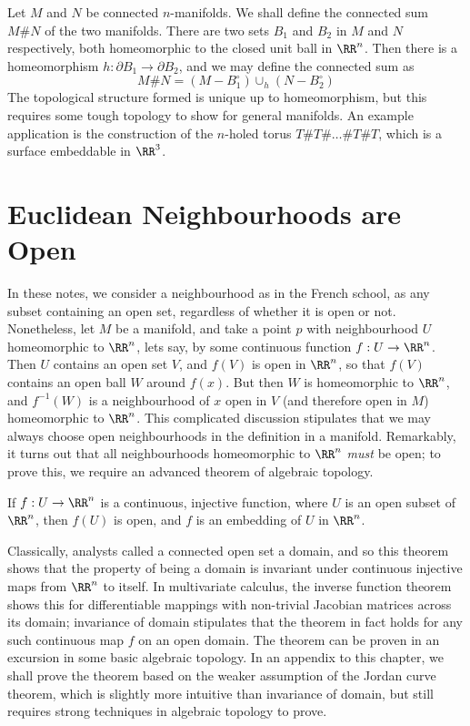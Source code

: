 \begin{example}
    Let $M$ and $N$ be connected $n$-manifolds. We shall define the connected sum $M \# N$ of the two manifolds. There are two sets $B_1$ and $B_2$ in $M$ and $N$ respectively, both homeomorphic to the closed unit ball in $\RR^n$. Then there is a homeomorphism $h:\partial B_1 \to \partial B_2$, and we may define the connected sum as
    \[ M \# N = (M - B_1^\circ) \cup_h (N - B_2^\circ) \]
    The topological structure formed is unique up to homeomorphism, but this requires some tough topology to show for general manifolds. An example application is the construction of the $n$-holed torus $T \# T \# \dots \# T \# T$, which is a surface embeddable in $\RR^3$.
\end{example}

\section{Euclidean Neighbourhoods are Open}

In these notes, we consider a neighbourhood as in the French school, as any subset containing an open set, regardless of whether it is open or not. Nonetheless, let $M$ be a manifold, and take a point $p$ with neighbourhood $U$ homeomorphic to $\RR^n$, lets say, by some continuous function $f: U \to \RR^n$. Then $U$ contains an open set $V$, and $f(V)$ is open in $\RR^n$, so that $f(V)$ contains an open ball $W$ around $f(x)$. But then $W$ is homeomorphic to $\RR^n$, and $f^{-1}(W)$ is a neighbourhood of $x$ open in $V$ (and therefore open in $M$) homeomorphic to $\RR^n$. This complicated discussion stipulates that we may always choose open neighbourhoods in the definition in a manifold. Remarkably, it turns out that all neighbourhoods homeomorphic to $\RR^n$ {\it must} be open; to prove this, we require an advanced theorem of algebraic topology.


\begin{theorem}
    If $f:U \to \RR^n$ is a continuous, injective function, where $U$ is an open subset of $\RR^n$, then $f(U)$ is open, and $f$ is an embedding of $U$ in $\RR^n$.
\end{theorem}

Classically, analysts called a connected open set a domain, and so this theorem shows that the property of being a domain is invariant under continuous injective maps from $\RR^n$ to itself. In multivariate calculus, the inverse function theorem shows this for differentiable mappings with non-trivial Jacobian matrices across its domain; invariance of domain stipulates that the theorem in fact holds for any such continuous map $f$ on an open domain. The theorem can be proven in an excursion in some basic algebraic topology. In an appendix to this chapter, we shall prove the theorem based on the weaker assumption of the Jordan curve theorem, which is slightly more intuitive than invariance of domain, but still requires strong techniques in algebraic topology to prove.

